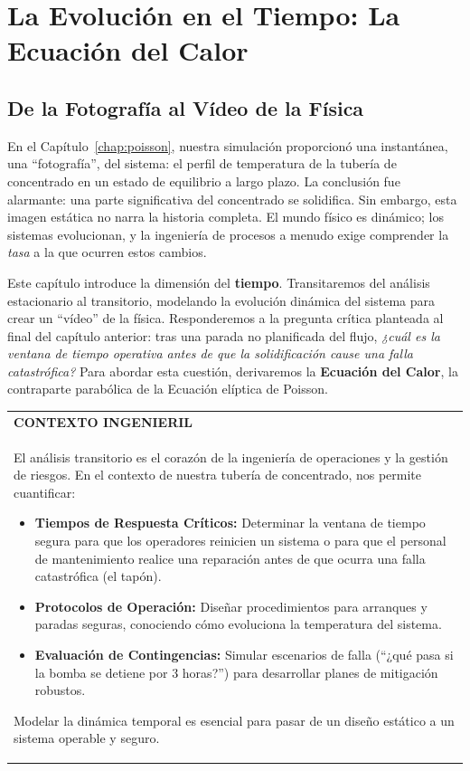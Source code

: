 \chapter{La Evolución en el Tiempo: La Ecuación del Calor}
\label{chap:heat}

\section{De la Fotografía al Vídeo de la Física}

En el Capítulo~\ref{chap:poisson}, nuestra simulación proporcionó una instantánea, una ``fotografía'', del sistema: el perfil de temperatura de la tubería de concentrado en un estado de equilibrio a largo plazo. La conclusión fue alarmante: una parte significativa del concentrado se solidifica. Sin embargo, esta imagen estática no narra la historia completa. El mundo físico es dinámico; los sistemas evolucionan, y la ingeniería de procesos a menudo exige comprender la \textit{tasa} a la que ocurren estos cambios.

Este capítulo introduce la dimensión del \textbf{tiempo}. Transitaremos del análisis estacionario al transitorio, modelando la evolución dinámica del sistema para crear un ``vídeo'' de la física. Responderemos a la pregunta crítica planteada al final del capítulo anterior: tras una parada no planificada del flujo, \textit{¿cuál es la ventana de tiempo operativa antes de que la solidificación cause una falla catastrófica?} Para abordar esta cuestión, derivaremos la \textbf{Ecuación del Calor}, la contraparte parabólica de la Ecuación elíptica de Poisson.

\begin{center}
\begin{tabular}{|p{}|}
\hline
\textbf{CONTEXTO INGENIERIL} \\
El análisis transitorio es el corazón de la ingeniería de operaciones y la gestión de riesgos. En el contexto de nuestra tubería de concentrado, nos permite cuantificar:
\begin{itemize}
    \item \textbf{Tiempos de Respuesta Críticos:} Determinar la ventana de tiempo segura para que los operadores reinicien un sistema o para que el personal de mantenimiento realice una reparación antes de que ocurra una falla catastrófica (el tapón).
    \item \textbf{Protocolos de Operación:} Diseñar procedimientos para arranques y paradas seguras, conociendo cómo evoluciona la temperatura del sistema.
    \item \textbf{Evaluación de Contingencias:} Simular escenarios de falla (``¿qué pasa si la bomba se detiene por 3 horas?'') para desarrollar planes de mitigación robustos.
\end{itemize}
Modelar la dinámica temporal es esencial para pasar de un diseño estático a un sistema operable y seguro. \\
\hline
\end{tabular}
\end{center}

